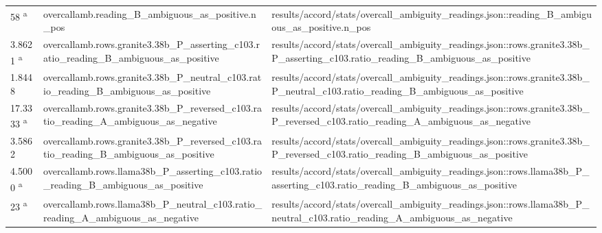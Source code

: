 \begin{longtable}{@{}p{0.7in}p{1.9in}p{2.6in}@{}}
58 \textsuperscript{a} & overcallamb.\allowbreak{}reading\_B\_ambiguous\_as\_positive.\allowbreak{}n\_pos & results/\allowbreak{}accord/\allowbreak{}stats/\allowbreak{}overcall\_ambiguity\_readings.\allowbreak{}json::reading\_B\_ambiguous\_as\_positive.\allowbreak{}n\_pos\\
3.8621 \textsuperscript{a} & overcallamb.\allowbreak{}rows.\allowbreak{}granite3.\allowbreak{}38b\_P\_asserting\_c103.\allowbreak{}ratio\_reading\_B\_ambiguous\_as\_positive & results/\allowbreak{}accord/\allowbreak{}stats/\allowbreak{}overcall\_ambiguity\_readings.\allowbreak{}json::rows.\allowbreak{}granite3.\allowbreak{}38b\_P\_asserting\_c103.\allowbreak{}ratio\_reading\_B\_ambiguous\_as\_positive\\
1.8448 & overcallamb.\allowbreak{}rows.\allowbreak{}granite3.\allowbreak{}38b\_P\_neutral\_c103.\allowbreak{}ratio\_reading\_B\_ambiguous\_as\_positive & results/\allowbreak{}accord/\allowbreak{}stats/\allowbreak{}overcall\_ambiguity\_readings.\allowbreak{}json::rows.\allowbreak{}granite3.\allowbreak{}38b\_P\_neutral\_c103.\allowbreak{}ratio\_reading\_B\_ambiguous\_as\_positive\\
17.3333 \textsuperscript{a} & overcallamb.\allowbreak{}rows.\allowbreak{}granite3.\allowbreak{}38b\_P\_reversed\_c103.\allowbreak{}ratio\_reading\_A\_ambiguous\_as\_negative & results/\allowbreak{}accord/\allowbreak{}stats/\allowbreak{}overcall\_ambiguity\_readings.\allowbreak{}json::rows.\allowbreak{}granite3.\allowbreak{}38b\_P\_reversed\_c103.\allowbreak{}ratio\_reading\_A\_ambiguous\_as\_negative\\
3.5862 & overcallamb.\allowbreak{}rows.\allowbreak{}granite3.\allowbreak{}38b\_P\_reversed\_c103.\allowbreak{}ratio\_reading\_B\_ambiguous\_as\_positive & results/\allowbreak{}accord/\allowbreak{}stats/\allowbreak{}overcall\_ambiguity\_readings.\allowbreak{}json::rows.\allowbreak{}granite3.\allowbreak{}38b\_P\_reversed\_c103.\allowbreak{}ratio\_reading\_B\_ambiguous\_as\_positive\\
4.5000 \textsuperscript{a} & overcallamb.\allowbreak{}rows.\allowbreak{}llama38b\_P\_asserting\_c103.\allowbreak{}ratio\_reading\_B\_ambiguous\_as\_positive & results/\allowbreak{}accord/\allowbreak{}stats/\allowbreak{}overcall\_ambiguity\_readings.\allowbreak{}json::rows.\allowbreak{}llama38b\_P\_asserting\_c103.\allowbreak{}ratio\_reading\_B\_ambiguous\_as\_positive\\
23 \textsuperscript{a} & overcallamb.\allowbreak{}rows.\allowbreak{}llama38b\_P\_neutral\_c103.\allowbreak{}ratio\_reading\_A\_ambiguous\_as\_negative & results/\allowbreak{}accord/\allowbreak{}stats/\allowbreak{}overcall\_ambiguity\_readings.\allowbreak{}json::rows.\allowbreak{}llama38b\_P\_neutral\_c103.\allowbreak{}ratio\_reading\_A\_ambiguous\_as\_negative\\

\end{longtable}
